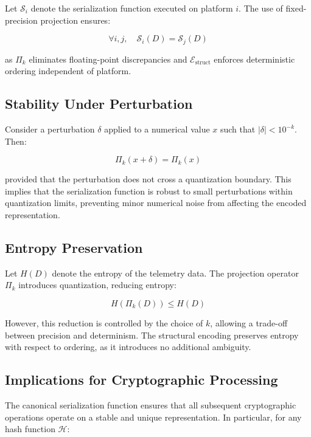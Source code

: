 Let $\mathcal{S}_i$ denote the serialization function executed on platform $i$. The use of fixed-precision projection ensures:

\begin{equation}
\forall i,j, \quad \mathcal{S}_i(D) = \mathcal{S}_j(D)
\end{equation}

as $\Pi_k$ eliminates floating-point discrepancies and $\mathcal{E}_{\text{struct}}$ enforces deterministic ordering independent of platform.

\subsection{Stability Under Perturbation}

Consider a perturbation $\delta$ applied to a numerical value $x$ such that $| \delta | < 10^{-k}$. Then:

\begin{equation}
\Pi_k(x + \delta) = \Pi_k(x)
\end{equation}

provided that the perturbation does not cross a quantization boundary. This implies that the serialization function is robust to small perturbations within quantization limits, preventing minor numerical noise from affecting the encoded representation.

\subsection{Entropy Preservation}

Let $H(D)$ denote the entropy of the telemetry data. The projection operator $\Pi_k$ introduces quantization, reducing entropy:

\begin{equation}
H(\Pi_k(D)) \leq H(D)
\end{equation}

However, this reduction is controlled by the choice of $k$, allowing a trade-off between precision and determinism. The structural encoding preserves entropy with respect to ordering, as it introduces no additional ambiguity.

\subsection{Implications for Cryptographic Processing}

The canonical serialization function ensures that all subsequent cryptographic operations operate on a stable and unique representation. In particular, for any hash function $\mathcal{H}$:

